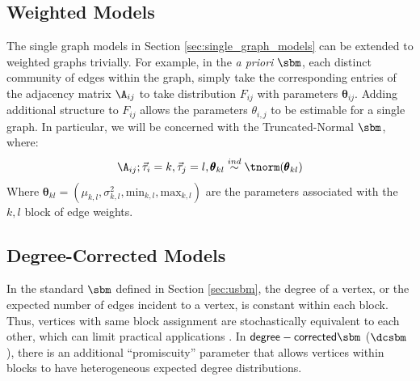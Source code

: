 \subsection{Weighted Models}

The single graph models in Section \ref{sec:single_graph_models} can be extended to weighted graphs trivially. For example, in the \textit{a priori} $\sbm$, each distinct community of edges within the graph, simply take the corresponding entries of the adjacency matrix $\A_{ij}$ to take distribution $F_{ij}$ with parameters $\pmb \theta_{ij}$. Adding additional structure to $F_{ij}$ allows the parameters $\theta_{i,j}$ to be estimable for a single graph. In particular, we will be concerned with the Truncated-Normal $\sbm$, where:
\begin{align*}
    \A_{ij}; \vec\tau_i = k, \vec\tau_j = l, \pmb \theta_{kl} \overset{ind}{\sim} \tnorm (\pmb \theta_{kl})
\end{align*}
Where $\pmb \theta_{kl} = (\mu_{k,l}, \sigma^2_{k,l}, \textrm{min}_{k,l}, \textrm{max}_{k,l})$ are the parameters associated with the $k, l$ block of edge weights.

\subsection{Degree-Corrected Models}
In the standard $\sbm$ defined in Section \ref{sec:usbm}, the degree of a vertex, or the expected number of edges incident to a vertex, is constant within each block. Thus, vertices with same block assignment are stochastically equivalent to each other, which can limit practical applications \cite{karrer2011stochastic}. 
In $\mathsf{degree-corrected} \sbm$ ($\dcsbm$),  there is an additional ``promiscuity'' parameter that allows vertices within blocks to have heterogeneous expected degree distributions. 

